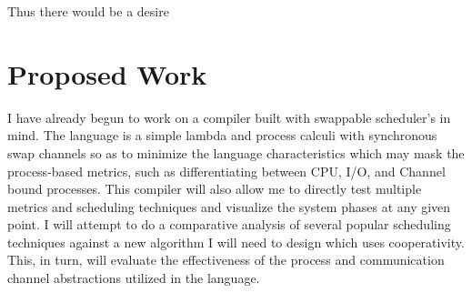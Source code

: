 Thus there would be a desire 

\section{Proposed Work} %



I have already begun to work on a compiler built with swappable scheduler's in mind. The language
is a simple lambda and process calculi with synchronous swap channels so as to minimize the language
characteristics which may mask the process-based metrics, such as differentiating between CPU, I/O,
and Channel bound processes. This compiler will also allow me to directly test multiple metrics and
scheduling techniques and visualize the system phases at any given point. I will attempt to do a
comparative analysis of several popular scheduling techniques against a new algorithm I will need to design
which uses cooperativity. This, in turn, will evaluate the effectiveness of the process and communication
channel abstractions utilized in the language.

